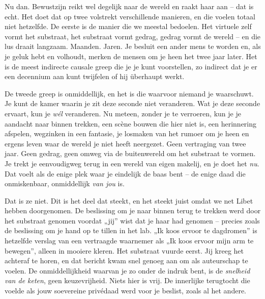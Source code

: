 \documentclass[11pt, twoside, openright]{book}
\begin{document}
Nu dan. Bewustzijn reikt wel degelijk naar de wereld en raakt haar aan -- dat is echt. Het doet dat op twee volstrekt verschillende manieren, en die voelen totaal niet hetzelfde. De eerste is de manier die we meestal bedoelen. Het virtuele zelf vormt het substraat, het substraat vormt gedrag, gedrag vormt de wereld -- en die lus draait langzaam. Maanden. Jaren. Je besluit een ander mens te worden en, als je geluk hebt en volhoudt, merken de mensen om je heen het twee jaar later. Het is de meest indirecte causale greep die je je kunt voorstellen, zo indirect dat je er een decennium aan kunt twijfelen of hij überhaupt werkt.

De tweede greep is onmiddellijk, en het is die waarvoor niemand je waarschuwt. Je kunt de kamer waarin je zit deze seconde niet veranderen. Wat je deze seconde ervaart, kun je \textit{wél} veranderen. Nu meteen, zonder je te verroeren, kun je je aandacht naar binnen trekken, een scène bouwen die hier niet is, een herinnering afspelen, wegzinken in een fantasie, je losmaken van het rumoer om je heen en ergens leven waar de wereld je niet heeft neergezet. Geen vertraging van twee jaar. Geen gedrag, geen omweg via de buitenwereld om het substraat te vormen. Je trekt je eenvoudigweg terug in een wereld van eigen makelij, en je doet het \textit{nu}. Dat voelt als de enige plek waar je eindelijk de baas bent -- de enige daad die onmiskenbaar, onmiddellijk \textit{van jou} is.

Dat is ze niet. Dit is het deel dat steekt, en het steekt juist omdat we net Libet hebben doorgenomen. De beslissing om je naar binnen terug te trekken werd door het substraat genomen voordat „jij” wist dat je haar had genomen -- precies zoals de beslissing om je hand op te tillen in het lab. „Ik koos ervoor te dagdromen” is hetzelfde verslag van een vertraagde waarnemer als „Ik koos ervoor mijn arm te bewegen”, alleen in mooiere kleren. Het substraat vuurde eerst. Jij kreeg het achteraf te horen, en dat bericht kwam snel genoeg aan om als auteurschap te voelen. De onmiddellijkheid waarvan je zo onder de indruk bent, is de \textit{snelheid van de keten}, geen keuzevrijheid. Niets hier is vrij. De innerlijke terugtocht die voelde als jouw soevereine privédaad werd voor je beslist, zoals al het andere.
\end{document}
